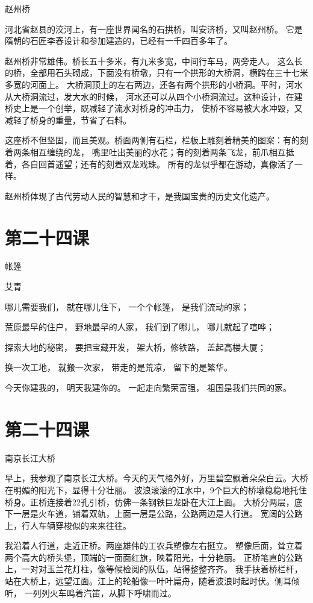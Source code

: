 \documentclass[12pt,UTF8]{ctexbook}
\begin{document}
赵州桥

河北省赵县的洨河上，有一座世界闻名的石拱桥，叫安济桥，又叫赵州桥。
它是隋朝的石匠李春设计和参加建造的，已经有一千四百多年了。

赵州桥非常雄伟。桥长五十多米，有九米多宽，中间行车马，两旁走人。
这么长的桥，全部用石头砌成，下面没有桥墩，只有一个拱形的大桥洞，横跨在三十七米多宽的河面上。
大桥洞顶上的左右两边，还各有两个拱形的小桥洞。平时，河水从大桥洞流过，发大水的时候，
河水还可以从四个小桥洞流过。这种设计，在建桥史上是一个创举，既减轻了流水对桥身的冲击力，
使桥不容易被大水冲毁，又减轻了桥身的重量，节省了石料。

这座桥不但坚固，而且美观。桥面两侧有石栏，栏板上雕刻着精美的图案：有的刻着两条相互缠绕的龙，
嘴里吐出美丽的水花；有的刻着两条飞龙，前爪相互抵着，各自回首遥望；还有的刻着双龙戏珠。
所有的龙似乎都在游动，真像活了一样。

赵州桥体现了古代劳动人民的智慧和才干，是我国宝贵的历史文化遗产。

\section{第二十四课}

帐篷

艾青

哪儿需要我们，
就在哪儿住下，
一个个帐篷，
是我们流动的家；

荒原最早的住户，
野地最早的人家，
我们到了哪儿，
哪儿就起了喧哗；

探索大地的秘密，
要把宝藏开发，
架大桥，修铁路，
盖起高楼大厦；

换一次工地，
就搬一次家，
带走的是荒凉，
留下的是繁华。

今天你建我的，
明天我建你的。
一起走向繁荣富强，
祖国是我们共同的家。

\section{第二十四课}

南京长江大桥

早上，我参观了南京长江大桥。今天的天气格外好，万里碧空飘着朵朵白云。大桥在明媚的阳光下，显得十分壮丽。
波浪滚滚的江水中，9个巨大的桥墩稳稳地托住桥身。正桥连接着22孔引桥，仿佛一条钢铁巨龙卧在大江上面。
大桥分两层，底下一层是火车道，铺着双轨，上面一层是公路，公路两边是人行道。
宽阔的公路上，行人车辆穿梭似的来来往往。

我沿着人行道，走近正桥。两座雄伟的工农兵塑像左右挺立。
塑像后面，耸立着两个高大的桥头堡，顶端的一面面红旗，映着阳光，十分艳丽。
正桥笔直的公路上，一对对玉兰花灯柱，像等候检阅的队伍，站得整整齐齐。
我手扶着桥栏杆，站在大桥上，远望江面。江上的轮船像一叶叶扁舟，随着波浪时起时伏。侧耳倾听，
一列列火车鸣着汽笛，从脚下呼啸而过。
\end{document}
